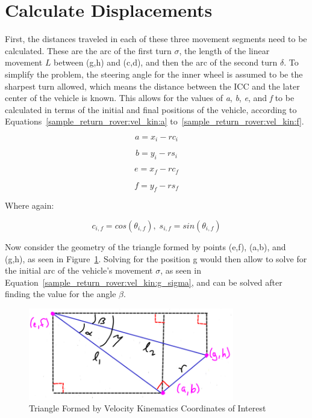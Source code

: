 \section{Calculate Displacements}
First, the distances traveled in each of these three movement segments need to be calculated. These are the arc of the first turn $\sigma$, the length of the linear movement $L$ between (g,h) and (c,d), and then the arc of the second turn $\delta$. To simplify the problem, the steering angle for the inner wheel is assumed to be the sharpest turn allowed, which means the distance between the \ac{ICC} and the later center of the vehicle is known. This allows for the values of \textit{a}, \textit{b}, \textit{e}, and \textit{f} to be calculated in terms of the initial and final positions of the vehicle, according to Equations~\ref{sample_return_rover:vel_kin:a} to~\ref{sample_return_rover:vel_kin:f}.

\begin{equation}\label{sample_return_rover:vel_kin:a}
	a = x_{i} - rc_{i}
\end{equation}

\begin{equation}\label{sample_return_rover:vel_kin:b}
	b = y_{i} - rs_{i}
\end{equation}

\begin{equation}\label{sample_return_rover:vel_kin:e}
	e = x_{f} - rc_{f}
\end{equation}

\begin{equation}\label{sample_return_rover:vel_kin:f}
	f = y_{f} - rs_{f}
\end{equation}

Where again:

\begin{equation}\label{sample_return_rover:vel_kin:csif}
	c_{i,f} = cos(\theta_{i,f}), \; s_{i,f} = sin(\theta_{i,f})
\end{equation}

Now consider the geometry of the triangle formed by points (e,f), (a,b), and (g,h), as seen in Figure~\ref{sample_return_rover:vel_kin:solving_g}. Solving for the position g would then allow to solve for the initial arc of the vehicle's movement $\sigma$, as seen in Equation~\ref{sample_return_rover:vel_kin:g_sigma}, and can be solved after finding the value for the angle $\beta$.

\begin{figure}[H]
	\centering
	\includegraphics[width=0.8\textwidth]{sections/robot-design/images/vel_kin_solving_g.png}
	\caption{Triangle Formed by Velocity Kinematics Coordinates of Interest}
	\label{sample_return_rover:vel_kin:solving_g}
\end{figure}

